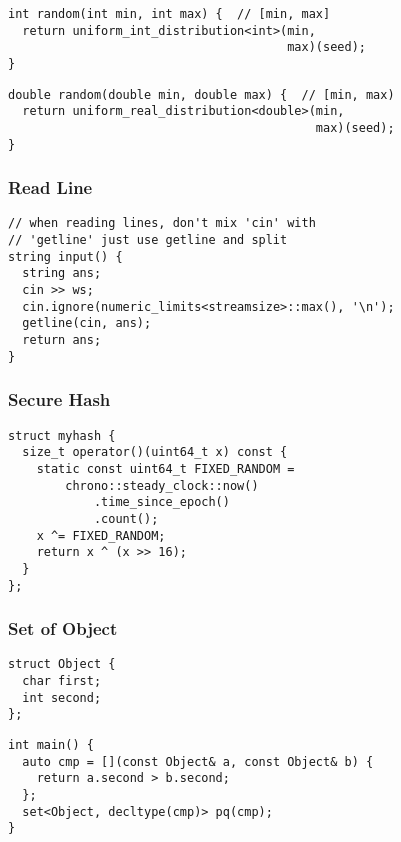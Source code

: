 \documentclass[twoside]{article}
\begin{document}
\begin{multicols*}{2}
\begin{verbatim}
int random(int min, int max) {  // [min, max]
  return uniform_int_distribution<int>(min,
                                       max)(seed);
}
\end{verbatim}
\vspace{-12pt}
\begin{verbatim}
double random(double min, double max) {  // [min, max)
  return uniform_real_distribution<double>(min,
                                           max)(seed);
}
\end{verbatim}

\subsubsectionfont{\large\bfseries\sffamily\underline}
\subsubsection*{Read Line}
\begin{verbatim}
// when reading lines, don't mix 'cin' with
// 'getline' just use getline and split
string input() {
  string ans;
  cin >> ws;
  cin.ignore(numeric_limits<streamsize>::max(), '\n');
  getline(cin, ans);
  return ans;
}
\end{verbatim}

\subsubsectionfont{\large\bfseries\sffamily\underline}
\subsubsection*{Secure Hash}
\begin{verbatim}
struct myhash {
  size_t operator()(uint64_t x) const {
    static const uint64_t FIXED_RANDOM =
        chrono::steady_clock::now()
            .time_since_epoch()
            .count();
    x ^= FIXED_RANDOM;
    return x ^ (x >> 16);
  }
};
\end{verbatim}

\subsubsectionfont{\large\bfseries\sffamily\underline}
\subsubsection*{Set of Object}
\begin{verbatim}
struct Object {
  char first;
  int second;
};
\end{verbatim}
\vspace{-12pt}
\begin{verbatim}
int main() {
  auto cmp = [](const Object& a, const Object& b) {
    return a.second > b.second;
  };
  set<Object, decltype(cmp)> pq(cmp);
}
\end{verbatim}


\end{multicols*}
\end{document}
